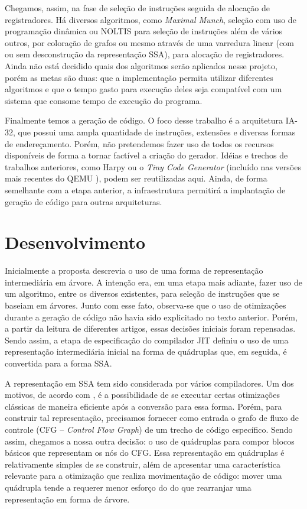 Chegamos, assim, na fase de seleção de instruções
seguida de alocação de registradores. Há diversos algoritmos, como
\textit{Maximal Munch}, seleção com uso de programação dinâmica ou
NOLTIS \cite{noltis}  para seleção de instruções além de vários
outros, por coloração de grafos ou mesmo através de uma varredura
linear \cite{linear_scan_regalloc} (com ou sem \cite{wimmer_franz}
desconstrução da representação SSA), para alocação de registradores.
Ainda não está decidido quais dos algoritmos serão aplicados nesse
projeto, porém as metas são duas: que a implementação permita utilizar
diferentes algoritmos e que o tempo gasto para execução deles
seja compatível com um sistema que consome tempo de execução do programa.

Finalmente temos a geração de código. O foco desse trabalho é a
arquitetura IA-32, que possui uma ampla quantidade de instruções, extensões e
diversas formas de endereçamento.
Porém, não pretendemos fazer uso de todos os recursos disponíveis de
forma a tornar factível a criação do gerador.
Idéias e trechos de trabalhos anteriores, como Harpy \cite{harpy}
ou o \textit{Tiny Code Generator} (incluído nas versões mais recentes do
QEMU \cite{qemu}), podem ser reutilizadas aqui.
Ainda, de forma semelhante com a etapa anterior, a infraestrutura
permitirá a implantação de geração de código para outras arquiteturas.


\section{Desenvolvimento}
\label{desenvolvimento}

Inicialmente a proposta descrevia o uso de uma forma de representação
intermediária em árvore. A intenção era, em uma etapa mais adiante,
fazer uso de um algoritmo, entre os diversos existentes, para seleção
de instruções que se baseiam em árvores. Junto com esse fato,
observa-se que o uso de otimizações durante a geração de código não
havia sido explicitado no texto anterior. Porém, a partir da leitura de
diferentes artigos, essas decisões iniciais foram repensadas. Sendo
assim, a etapa de especificação do compilador JIT definiu o uso de uma
representação intermediária inicial na forma de quádruplas que, em
seguida, é convertida para a forma SSA.

A representação em SSA tem sido considerada por vários compiladores.
Um dos motivos, de acordo com , é a
possibilidade de se executar certas otimizações clássicas de maneira
eficiente após a conversão para essa forma. Porém, para construir tal
representação, precisamos fornecer como entrada o grafo de fluxo de
controle (CFG -- \textit{Control Flow Graph}) de um trecho de código
específico. Sendo assim, chegamos a nossa outra decisão: o uso de
quádruplas para compor blocos básicos que representam os nós do
CFG. Essa representação em quádruplas é relativamente simples de se
construir, além de apresentar uma característica relevante para a
otimização que realiza movimentação de código: mover
uma quádrupla tende a requerer menor esforço do
do que rearranjar uma representação em forma de árvore.

